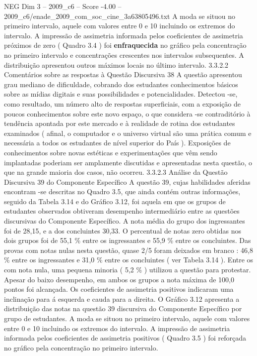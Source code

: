 \begin{textsample}{NEG Dim 3 – 2009\_c6 – Score -4.00 – 2009\_c6/enade\_2009\_com\_soc\_cine\_3a63805496.txt}
A moda se situou no primeiro intervalo, aquele com valores entre 0 e 10 incluindo os extremos do intervalo.
A impressão de assimetria informada pelos coeficientes de assimetria próximos de zero ( Quadro 3.4 ) foi \textbf{enfraquecida} no gráfico pela concentração no primeiro intervalo e concentrações crescentes nos intervalos subsequentes.
A distribuição apresentou outros máximos locais no último intervalo. 3.3.2.2 Comentários sobre as respostas à Questão Discursiva 38 A questão apresentou grau mediano de dificuldade, cobrando dos estudantes conhecimentos básicos sobre as mídias digitais e suas possibilidades e potencialidades.
Detectou -se, como resultado, um número alto de respostas superficiais, com a exposição de poucos conhecimentos sobre este novo espaço, o que considera -se contraditório à tendência apontada por este mercado e à realidade de rotina dos estudantes examinados ( afinal, o computador e o universo virtual são uma prática comum e necessária a todos os estudantes de nível superior do País ).
Exposições de conhecimentos sobre novas estéticas e experimentações que vêm sendo implantadas poderiam ser amplamente discutidas e apresentadas nesta questão, o que na grande maioria dos casos, não ocorreu. 3.3.2.3 Análise da Questão Discursiva 39 do Componente Específico A questão 39, cujas habilidades aferidas encontram -se descritas no Quadro 3.5, que ainda contém outras informações, seguido da Tabela 3.14 e do Gráfico 3.12, foi aquela em que os grupos de estudantes observados obtiveram desempenho intermediário entre as questões discursivas do Componente Específico.
A nota média do grupo dos ingressantes foi de 28,15, e a dos concluintes 30,33.
O percentual de notas zero obtidas nos dois grupos foi de 55,1 \% entre os ingressantes e 55,9 \% entre os concluintes.
Das provas com notas nulas nesta questão, quase 2/5 foram deixados em branco : 46,8 \% entre os ingressantes e 31,0 \% entre os concluintes ( ver Tabela 3.14 ).
Entre os com nota nula, uma pequena minoria ( 5,2 \% ) utilizou a questão para protestar.
Apesar do baixo desempenho, em ambos os grupos a nota máxima de 100,0 pontos foi alcançada.
Os coeficientes de assimetria positivos indicaram uma inclinação para á esquerda e cauda para a direita.
O Gráfico 3.12 apresenta a distribuição das notas na questão 39 discursiva do Componente Específico por grupo de estudantes.
A moda se situou no primeiro intervalo, aquele com valores entre 0 e 10 incluindo os extremos do intervalo.
A impressão de assimetria informada pelos coeficientes de assimetria positivos ( Quadro 3.5 ) foi reforçada no gráfico pela concentração no primeiro intervalo.

\end{textsample}
